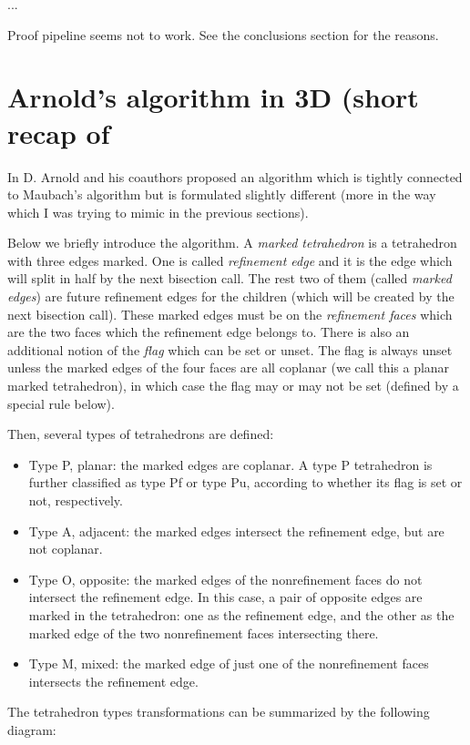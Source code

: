 \documentclass[a4paper,12pt]{amsart}
\numberwithin{equation}{section}
\begin{document}
...

Proof pipeline seems not to work. See the conclusions section for the reasons.

\section{Arnold's algorithm in 3D (short recap of \cite{arnold} }

In \cite{arnold} D. Arnold and his coauthors proposed an algorithm which is tightly connected to Maubach's algorithm but is formulated slightly different (more in the way which I was trying to mimic in the previous sections).

Below we briefly introduce the algorithm. 
A \textit{marked tetrahedron} is a tetrahedron with three edges marked. One is called \textit{refinement edge} and it is the edge which will split in half by the next bisection call. The rest two of them (called \textit{marked edges}) are future refinement edges for the children (which will be created by the next bisection call). These marked edges must be on the \textit{refinement faces} which are the two faces which the refinement edge belongs to. There is also an additional notion of the \textit{flag} which can be set or unset. The flag is always unset unless the marked edges of the
four faces are all coplanar (we call this a planar marked tetrahedron), in which case
the flag may or may not be set (defined by a special rule below).

Then, several types of tetrahedrons are defined:
\begin{itemize}
\item  Type P, planar: the marked edges are coplanar. A type P tetrahedron is further 		classified as type Pf or type Pu, according to whether its flag is set or not, 			respectively.
\item Type A, adjacent: the marked edges intersect the refinement edge, but are
	not coplanar.
\item Type O, opposite: the marked edges of the nonrefinement faces do not intersect 		the refinement edge. In this case, a pair of opposite edges are marked in the 			tetrahedron: one as the refinement edge, and the other as the marked edge of the 		two nonrefinement faces intersecting there.
\item Type M, mixed: the marked edge of just one of the nonrefinement faces
	intersects the refinement edge.
\end{itemize}

The tetrahedron types transformations can be summarized by the following diagram:
\end{document}

